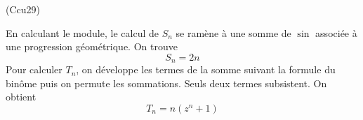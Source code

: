 \begin{tiny}(Ccu29)\end{tiny} En calculant le module, le calcul de $S_n$ se ramène à une somme de $\sin$ associée à une progression géométrique. On trouve
\begin{displaymath}
 S_n = 2n
\end{displaymath}
Pour calculer $T_n$, on développe les termes de la somme suivant la formule du binôme puis on permute les sommations. Seuls deux termes subsistent. On obtient
\begin{displaymath}
 T_n = n(z^n +1)
\end{displaymath}
